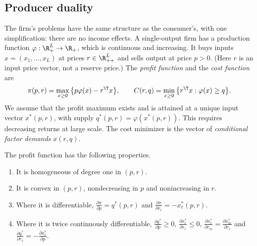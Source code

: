 \subsection{Producer duality}\label{sec:B-producer}

The firm's problems have the same structure as the consumer's, with one simplification: there are no
income effects. A single-output firm has a production function $\varphi : \R^L_+ \to \R_+$, which is
continuous and increasing. It buys inputs $x = (x_1, \dots, x_L)$ at prices $r \in \R^L_{++}$ and sells output at
price $p > 0$. (Here $r$ is an input price vector, not a reserve price.) The \emph{profit function} and the
\emph{cost function} are
\begin{equation}\label{eq:B-profit-cost}
\pi(p, r) = \max_{x \geq 0}\big\{p\varphi(x) - r^\T x\big\},
\qquad
C(r, q) = \min_{x \geq 0}\big\{r^\T x : \varphi(x) \geq q\big\}.
\end{equation}
We assume that the profit maximum exists and is attained at a unique input vector $x^*(p, r)$, with supply
$q^*(p, r) = \varphi(x^*(p, r))$. This requires decreasing returns at large scale. The cost minimizer is the
vector of \emph{conditional factor demands} $x(r, q)$.

\begin{proposition}\label{prop:B-profit-fn}
The profit function has the following properties.
\begin{enumerate}[label=(\roman*)]
\item It is homogeneous of degree one in $(p, r)$.
\item It is convex in $(p, r)$, nondecreasing in $p$ and nonincreasing in $r$.
\item Where it is differentiable, $\frac{\partial\pi}{\partial p} = q^*(p, r)$ and
  $\frac{\partial\pi}{\partial r_\ell} = -x^*_\ell(p, r)$.
\item Where it is twice continuously differentiable, $\frac{\partial q^*}{\partial p} \geq 0$,
  $\frac{\partial x^*_\ell}{\partial r_\ell} \leq 0$, $\frac{\partial x^*_\ell}{\partial r_m} = \frac{\partial x^*_m}{\partial r_\ell}$
  and $\frac{\partial q^*}{\partial r_\ell} = -\frac{\partial x^*_\ell}{\partial p}$.
\end{enumerate}
\end{proposition}

